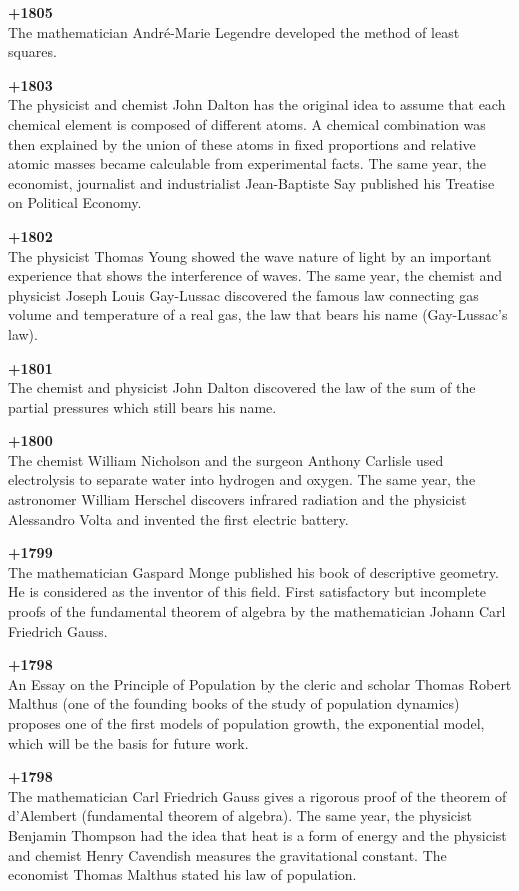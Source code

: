 \textbf{+1805}\\
The mathematician André-Marie Legendre developed the method of least squares.

\textbf{+1803}\\
The physicist and chemist John Dalton has the original idea to assume that each chemical element is composed of different atoms. A chemical combination was then explained by the union of these atoms in fixed proportions and relative atomic masses became calculable from experimental facts. The same year, the economist, journalist and industrialist Jean-Baptiste Say published his Treatise on Political Economy.

\textbf{+1802}\\
The physicist Thomas Young showed the wave nature of light by an important experience that shows the interference of waves. The same year, the chemist and physicist Joseph Louis Gay-Lussac discovered the famous law connecting gas volume and temperature of a real gas, the law that bears his name (Gay-Lussac's law).

\textbf{+1801}\\
The chemist and physicist John Dalton discovered the law of the sum of the partial pressures which still bears his name.

\textbf{+1800}\\
The chemist William Nicholson and the surgeon Anthony Carlisle used electrolysis to separate water into hydrogen and oxygen. The same year, the astronomer William Herschel discovers infrared radiation and the physicist Alessandro Volta and invented the first electric battery.

\textbf{+1799}\\
The mathematician Gaspard Monge published his book of descriptive geometry. He is considered as the inventor of this field. First satisfactory but incomplete proofs of the fundamental theorem of algebra by the mathematician Johann Carl Friedrich Gauss.

\textbf{+1798}\\
An Essay on the Principle of Population by the cleric and scholar Thomas Robert Malthus (one of the founding books of the study of population dynamics) proposes one of the first models of population growth, the exponential model, which will be the basis for future work.

\textbf{+1798}\\
The mathematician Carl Friedrich Gauss gives a rigorous proof of the theorem of d'Alembert (fundamental theorem of algebra). The same year, the physicist Benjamin Thompson had the idea that heat is a form of energy and the physicist and chemist Henry Cavendish measures the gravitational constant. The economist Thomas Malthus stated his law of population.

